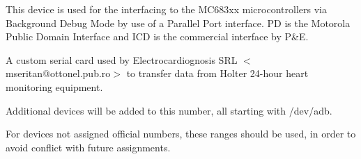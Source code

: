 \noindent
This device is used for the interfacing to the MC683xx
microcontrollers via Background Debug Mode by use of a Parallel Port
interface. PD is the Motorola Public Domain Interface and ICD is the
commercial interface by P\&E.

\begin{devicelist}
\end{devicelist}

\noindent
A custom serial card used by Electrocardiognosis SRL
$<$mseritan@ottonel.pub.ro$>$ to transfer data from Holter 24-hour
heart monitoring equipment.

\begin{devicelist}
\end{devicelist}

\begin{devicelist}
\end{devicelist}

\noindent
Additional devices will be added to this number, all starting with
{\file /dev/adb}.

\begin{devicelist}
	\minordots
\end{devicelist}

\begin{devicelist}
	\minordots
\end{devicelist}

\begin{devicelist}
\end{devicelist}

\begin{devicelist}
\end{devicelist}

\noindent
For devices not assigned official numbers, these ranges should be
used, in order to avoid conflict with future assignments.

